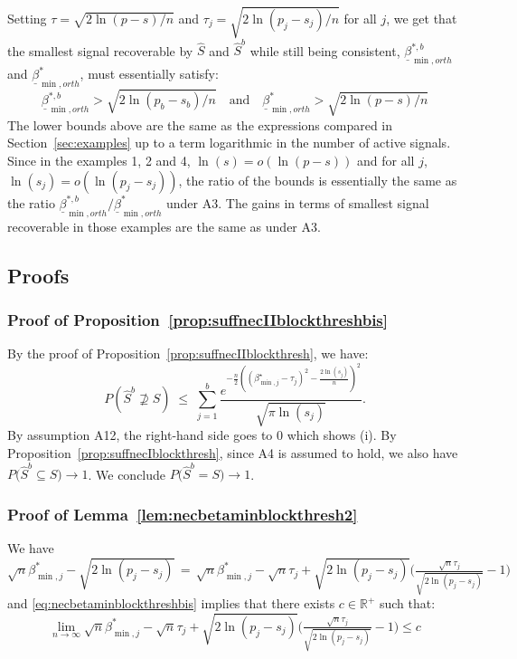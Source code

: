 \documentclass[aos]{imsart}
\theoremstyle{plain}
\newcommand{\R}{\mathbb{R}}
\begin{document}
Setting $\tau=\sqrt{2\ln(p-s)/n}$ and $\tau_j=\sqrt{2\ln(p_j-s_j)/n}$ for all $j$, we get that the smallest signal recoverable by $\hat S$ and $\hat S^b$ while still being consistent, $\underline{\beta}^{*,b}_{\min,orth}$ and $\underline{\beta}^{*}_{\min,orth}$, must essentially satisfy:
$$\underline{\beta}^{*,b}_{\min,orth}>\sqrt{2\ln(p_b-s_b)/n}\quad \text{and}\quad \underline{\beta}^{*}_{\min,orth}>\sqrt{2\ln(p-s)/n}$$
The lower bounds above are the same as the expressions compared in Section~\ref{sec:examples} up to a term logarithmic in the number of active signals.  Since in the examples 1, 2 and 4, $\ln(s)=o(\ln(p-s))$ and for all $j$, $\ln(s_j)=o(\ln(p_j-s_j))$, the ratio of the bounds is essentially the same as the ratio  $\underline{\beta}^{*,b}_{\min,orth}/\underline{\beta}^{*}_{\min,orth}$ under A3. The gains in terms of smallest signal recoverable in those examples are the same as under A3.

\subsection{Proofs}

\subsubsection{Proof of Proposition~\ref{prop:suffnecIIblockthreshbis}}
By the proof of Proposition~\ref{prop:suffnecIIblockthresh}, we have: \begin{equation*}
P(\hat{S}^{b}\not\supseteq  S)\;\leq\; \sum_{j=1}^b\frac{e^{-\tfrac{n}{2}\left((\beta^\star_{\min,j}-\tau_j)^2-\tfrac{2\ln(s_j)}{n}\right)^2}}{\sqrt{\pi\ln(s_j)}}.
 \end{equation*}
By assumption A12, the right-hand side goes to 0 which shows (i). By Proposition~\ref{prop:suffnecIblockthresh}, since A4 is assumed to hold, we also have $P\big(\hat{S}^{b} \subseteq S\big)\to 1$. We conclude $P\big(\hat{S}^{b} = S\big)\to 1$.

\subsubsection{Proof of Lemma~\ref{lem:necbetaminblockthresh2}}
 We have $\sqrt{n}\beta_{\min,j}^*-\sqrt{2\ln(p_j-s_j)} \,=\, \sqrt{n}\beta_{\min,j}^*-\sqrt{n}\tau_j+\sqrt{2\ln(p_j-s_j)}\Big(\tfrac{\sqrt{n}\tau_j}{\sqrt{2\ln(p_j-s_j)}}-1\Big)$ and \eqref{eq:necbetaminblockthreshbis} implies that there exists $c\in\R^+$ such that:
  \begin{equation}\label{eq:proofnecbetaminbis}
      \lim_{n\to \infty}\sqrt{n}\beta_{\min,j}^*-\sqrt{n}\tau_j+\sqrt{2\ln(p_j-s_j)}\Big(\tfrac{\sqrt{n}\tau_j}{\sqrt{2\ln(p_j-s_j)}}-1\Big)\leq c
  \end{equation}
\end{document}
